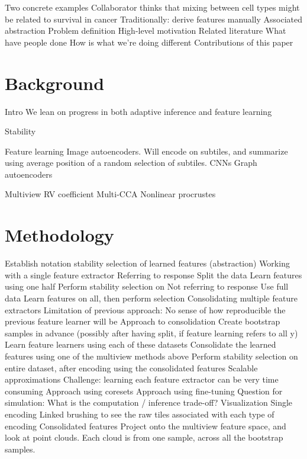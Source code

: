 \documentclass[11pt]{article}
\title{}
\author{Kris Sankaran}
\begin{document}
\maketitle


\begin{outline}
\1 Two concrete examples
  \2 Collaborator thinks that mixing between cell types might be related to
  survival in cancer
  \2 Traditionally: derive features manually
\1 Associated abstraction
  \2 Problem definition
  \2 High-level motivation
\1 Related literature
  \2 What have people done
  \2 How is what we're doing different
\1 Contributions of this paper
\end{outline}

\section{Background}

\begin{outline}
\1 Intro
  \2 We lean on progress in both adaptive inference and feature learning

\1 Stability

\1 Feature learning
  \2 Image autoencoders. Will encode on subtiles, and summarize using average
  position of a random selection of subtiles.
  \2 CNNs
  \2 Graph autoencoders

\1 Multiview
  \2 RV coefficient
  \2 Multi-CCA
  \2 Nonlinear procrustes
\end{outline}

\section{Methodology}

\begin{outline}
\1 Establish notation
\1 stability selection of learned features (abstraction)
  \2 Working with a single feature extractor
    \3 Referring to response
      \4 Split the data
      \4 Learn features using one half
      \4 Perform stability selection on 
    \3 Not referring to response
      \4 Use full data
      \4 Learn features on all, then perform selection
  \2 Consolidating multiple feature extractors
    \3 Limitation of previous approach: No sense of how reproducible the
    previous feature learner will be
    \3 Approach to consolidation
      \4 Create bootstrap samples in advance (possibly after having split, if feature learning refers to all y)
      \4 Learn feature learners using each of these datasets
      \4 Consolidate the learned features using one of the multiview methods above
      \4 Perform stability selection on entire dataset, after encoding using the consolidated features
\1 Scalable approximations
  \2 Challenge: learning each feature extractor can be very time consuming
  \2 Approach using coresets
  \2 Approach using fine-tuning
  \2 Question for simulation: What is the computation / inference trade-off?
\1 Visualization
  \2 Single encoding
    \3 Linked brushing to see the raw tiles associated with each type of encoding
  \2 Consolidated features
    \3 Project onto the multiview feature space, and look at point clouds. Each
    cloud is from one sample, across all the bootstrap samples.
\end{outline}
\end{document}
